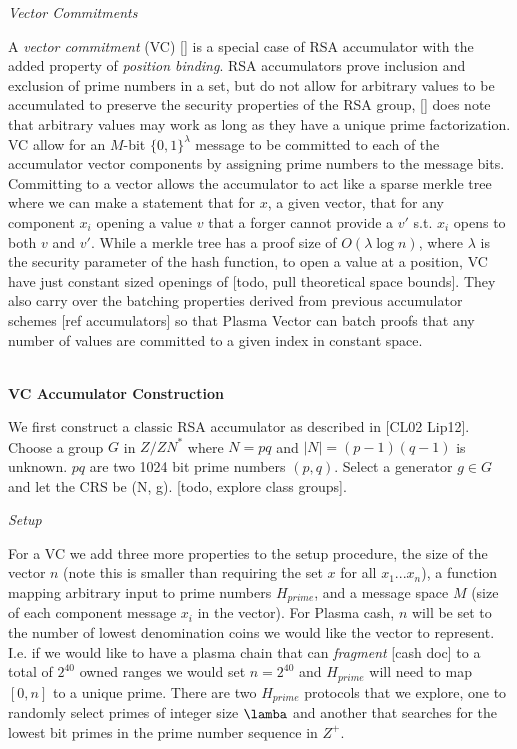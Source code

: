 \documentclass[11pt]{article}
\begin{document}
\centerline{\textit{Vector Commitments}}

A \textit{vector commitment} (VC) [] is a special case of RSA accumulator with the added property of \textit{position binding}. RSA accumulators prove inclusion and exclusion of prime numbers in a set, but do not allow for arbitrary values to be accumulated to preserve the security properties of the RSA group, [] does note that arbitrary values may work as long as they have a unique prime factorization. VC allow for an $M$-bit $\{0,1\}^\lambda$ message to be committed to each of the accumulator vector components by assigning prime numbers to the message bits. Committing to a vector allows the accumulator to act like a sparse merkle tree where we can make a statement that for $x$, a given vector, that for any component $x_i$ opening a value $v$ that a forger cannot provide a $v'$ s.t. $x_i$ opens to both $v$ and $v'$. While a merkle tree has a proof size of $O(\lambda \log n)$, where $\lambda$ is the security parameter of the hash function, to open a value at a position, VC have just constant sized openings of [todo, pull theoretical space bounds]. They also carry over the batching properties derived from previous accumulator schemes [ref accumulators] so that Plasma Vector can batch proofs that any number of values are committed to a given index in constant space.
\\
\\

\centerline{\textbf{VC Accumulator Construction}}

We first construct a classic RSA accumulator as described in [CL02 Lip12]. Choose a group $G$ in ${Z/ZN}^*$ where $N=pq$ and $|N| = (p-1)(q-1)$ is unknown. $pq$ are two 1024 bit prime numbers $(p,q)$. Select a generator $g \in G$ and let the CRS be (N, g). [todo, explore class groups].
\\

\centerline{\textit{Setup}}

For a VC we add three more properties to the setup procedure, the size of the vector $n$ (note this is smaller than requiring the set $x$ for all $x_1...x_n$), a function mapping arbitrary input to prime numbers $H_{prime}$, and a message space $M$ (size of each component message $x_i$ in the vector). For Plasma cash, $n$ will be set to the number of lowest denomination coins we would like the vector to represent. I.e. if we would like to have a plasma chain that can \textit{fragment} [cash doc] to a total of $2^{40}$ owned ranges we would set $n=2^{40}$ and $H_{prime}$ will need to map $[0,n]$ to a unique prime. There are two $H_{prime}$ protocols that we explore, one to randomly select primes of integer size $\lamba$ and another that searches for the lowest bit primes in the prime number sequence in $Z^+$.
\\
\end{document}
